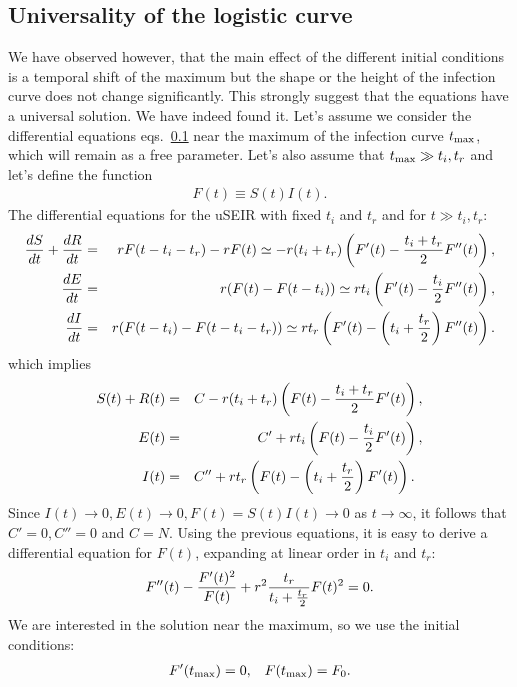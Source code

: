 \documentclass[a4paper,oneside,11pt]{article}
\begin{document}
  \subsection{Universality of the logistic curve}
  
   We have observed however, that the main effect of the different initial conditions is a temporal shift of the maximum but the shape or the height of the infection curve does not change significantly. This strongly suggest that the equations have a universal solution. We have indeed found it. Let's assume we consider the differential equations eqs.~\ref{} near the maximum of the infection curve $t_{\rm max}$, which will remain as a free parameter. Let's also assume that $t_{\rm max} \gg t_i, t_r$ and let's define the function
 \begin{eqnarray}
 F(t) \equiv S(t) I(t).
 \end{eqnarray} 
 The differential equations for the uSEIR with fixed $t_i$ and $t_r$ and for $t\gg t_i, t_r$:
 \begin{eqnarray}
 {d S \over dt}+{d R\over dt} &=& r F(t-t_i - t_r) - r F(t) \simeq -r (t_i+t_r) \left(F'(t)-{t_i+t_r\over 2} F''(t)\right), \nonumber\\
  {d E \over dt} &=& r (F(t) - F(t-t_i))  \simeq r t_i \left(F'(t)-{t_i\over 2} F''(t)\right) , \nonumber\\
   {d I \over dt} &=& r (F(t-t_i) - F(t-t_i-t_r))  \simeq r t_r \left(F'(t) - \left(t_i+{t_r\over 2}\right) F''(t)\right).
 \end{eqnarray}
 which implies
 \begin{eqnarray}
 S(t)+R(t) &=& C - r (t_i + t_r) \left(F(t)-{t_i+t_r\over 2} F'(t)\right), \nonumber\\
   E(t) &=& C' +r t_i \left( F(t)-{t_i\over 2} F'(t)\right), \nonumber\\
   I(t) &=& C'' +r t_r \left(F(t)-\left(t_i+{t_r\over 2}\right) F'(t)\right). \;\;
 \end{eqnarray}
 Since $I(t) \rightarrow 0, E(t)\rightarrow 0, F(t) = S(t) I(t) \rightarrow 0$ as $t\rightarrow \infty$, it follows that $C'=0, C''=0$ and $C= N$.
 Using the previous equations, it is easy to derive a differential equation for $F(t)$, expanding at linear order in $t_i$ and $t_r$:
  \begin{eqnarray}
 F''(t) - {F'(t)^2\over F(t)} + r^2 {t_r\over t_i+{t_r\over 2}} F(t)^2 = 0. 
 \end{eqnarray}
 We are interested in the solution near the maximum, so we use the initial conditions:
 \begin{eqnarray}
 F'(t_{\rm max}) = 0, \;\;\; F(t_{\rm max}) = F_0.
 \end{eqnarray}
\end{document}
